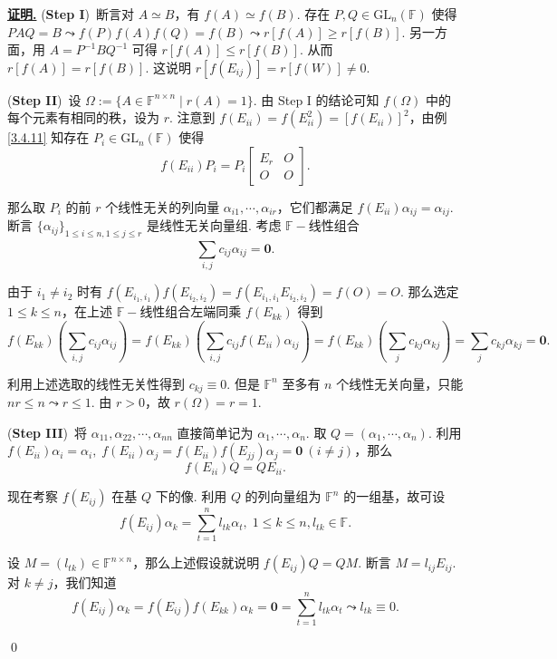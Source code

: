 \documentclass[10pt,openany]{article}
\theoremstyle{thmstyle} %
\theoremstyle{defstyle} %
\theoremstyle{prostyle} %
\theoremstyle{exastyle}
\theoremstyle{remstyle}
\renewenvironment{proof}[1][证明]{\par\underline{\textbf{#1.}} \;\fangsong}{\qed\par}
\newcommand{\F}{\mathbb{F}}
\newcommand{\gfn}{\text{GL}_n(\mathbb{F})}
\newcommand{\n}{^{n \times n}}
\begin{document}
\begin{proof}
	(\textbf{Step I})\ 断言对 \( A \simeq B \)，有 \( f(A) \simeq f(B) \). 存在 \( P,Q \in \gfn \) 使得 \( PAQ=B \leadsto f(P)f(A)f(Q)=f(B) \leadsto r[f(A)] \geq r[f(B)] \). 另一方面，用 \( A=P^{-1}BQ^{-1} \) 可得 \( r[f(A)] \leq r[f(B)] \). 从而 \( r[f(A)] = r[f(B)] \). 这说明 \( r[f(E_{ij})] = r[f(W)] \neq 0 \).
	
    (\textbf{Step II})\ 设 \( \Omega:=\{A \in \F\n \mid r(A)=1 \} \). 由 Step I 的结论可知 \( f(\Omega) \) 中的每个元素有相同的秩，设为 \( r \). 注意到 \( f(E_{ii})=f(E_{ii}^2)=[f(E_{ii})]^2 \)，由例 \ref{3.4.11} 知存在 \( P_i \in \gfn \) 使得
    \[ f(E_{ii})P_i=P_i\begin{bmatrix}
    	E_r & O \\
    	O & O
    \end{bmatrix}. \]
    
    那么取 \( P_i \) 的前 \( r \) 个线性无关的列向量 \( \alpha_{i1},\cdots,\alpha_{ir} \)，它们都满足 \( f(E_{ii})\alpha_{ij}=\alpha_{ij} \). 断言 \( \{\alpha_{ij} \}_{1 \leq i \leq n, 1 \leq j \leq r} \) 是线性无关向量组. 考虑 \( \F-\)线性组合
    \[ \sum_{i,j}^{} c_{ij}\alpha_{ij}=\bm{0}. \]
    
    由于 \( i_1 \neq i_2 \) 时有 \( f(E_{i_1,i_1})f(E_{i_2,i_2})=f(E_{i_1,i_1}E_{i_2,i_2})=f(O)=O \). 那么选定 \( 1 \leq k \leq n \)，在上述 \( \F-\)线性组合左端同乘 \( f(E_{kk}) \) 得到
    \[ f(E_{kk}) \left( \sum_{i,j}^{} c_{ij}\alpha_{ij} \right)= f(E_{kk}) \left( \sum_{i,j}^{} c_{ij}f(E_{ii})\alpha_{ij} \right)= f(E_{kk}) \left( \sum_{j}^{} c_{kj}\alpha_{kj} \right)=\sum_{j}^{} c_{kj}\alpha_{kj}=\bm{0}. \]
    
    利用上述选取的线性无关性得到 \( c_{kj} \equiv 0 \). 但是 \( \F^n \) 至多有 \( n \) 个线性无关向量，只能 \( nr \leq n \leadsto r \leq 1 \). 由 \( r>0 \)，故 \( r(\Omega)=r=1 \).
    
    (\textbf{Step III})\ 将 \( \alpha_{11},\alpha_{22},\cdots,\alpha_{nn} \) 直接简单记为 \( \alpha_1,\cdots,\alpha_n \). 取 \( Q=(\alpha_1,\cdots,\alpha_n) \). 利用 \( f(E_{ii})\alpha_i=\alpha_i, \; f(E_{ii})\alpha_j=f(E_{ii})f(E_{jj})\alpha_j=\bm{0} \ (i \neq j) \)，那么
    \[ f(E_{ii})Q=QE_{ii}. \]
    
    现在考察 \( f(E_{ij}) \) 在基 \( Q \) 下的像. 利用 \( Q \) 的列向量组为 \( \F^n \) 的一组基，故可设
    \[ f(E_{ij})\alpha_k= \sum_{t=1}^{n} l_{tk} \alpha_t, \; 1 \leq k \leq n, l_{tk} \in \F. \]
    
    设 \( M=(l_{tk}) \in \F\n \)，那么上述假设就说明 \( f(E_{ij})Q=QM \). 断言 \( M=l_{ij}E_{ij} \). 对 \( k \neq j \)，我们知道
    \[ f(E_{ij})\alpha_k=f(E_{ij})f(E_{kk})\alpha_k=\bm{0}=\sum_{t=1}^{n} l_{tk} \alpha_t \leadsto l_{tk} \equiv 0. \]
    

\end{proof}
\end{document}
